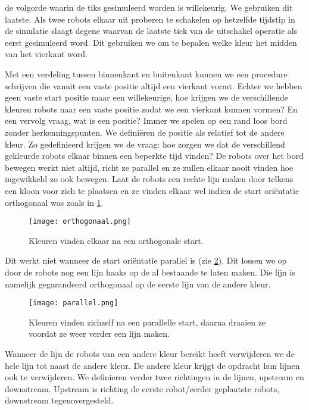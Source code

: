 \documentclass[10pt]{article}
\begin{document}
 de volgorde waarin de tiks gesimuleerd worden is willekeurig. We gebruiken dit laatste. Als twee robots elkaar uit proberen te schakelen op hetzelfde tijdstip in de simulatie slaagt degene waarvan de laatste tick van de uitschakel operatie als eerst gesimuleerd word. Dit gebruiken we om te bepalen welke kleur het midden van het vierkant word.

\label{lijnen}
Met een verdeling tussen binnenkant en buitenkant kunnen we een procedure schrijven die vanuit een vaste positie altijd een vierkant vormt. Echter we hebben geen vaste start positie maar een willekeurige, hoe krijgen we de verschillende kleuren robots naar een vaste positie zodat we een vierkant kunnen vormen? En een vervolg vraag, wat is een positie? Immer we spelen op een rand loos bord zonder herkenningspunten. We definiëren de positie als relatief tot de andere kleur. Zo gedefinieerd krijgen we de vraag: hoe zorgen we dat de verschillend gekleurde robots elkaar binnen een beperkte tijd vinden? De robots over het bord bewegen werkt niet altijd, richt ze parallel en ze zullen elkaar nooit vinden hoe ingewikkeld zo ook bewegen. Laat de robots een rechte lijn maken door telkens een kloon voor zich te plaatsen en ze vinden elkaar wel indien de start oriëntatie orthogonaal was zoals in \ref{fig:0a}. 

\begin{figure}[h!]
  \centering
  \texttt{[image: orthogonaal.png]}
  \caption{Kleuren vinden elkaar na een orthogonale start.}
  \label{fig:0a}
\end{figure}

Dit werkt niet wanneer de start oriëntatie parallel is (zie \ref{fig:0b}). Dit lossen we op door de robots nog een lijn haaks op de al bestaande te laten maken. Die lijn is namelijk gegarandeerd orthogonaal op de eerste lijn van de andere kleur. 

\begin{figure}[h!]
  \centering
  \texttt{[image: parallel.png]}
  \caption{Kleuren vinden zichzelf na een parallelle start, daarna draaien ze voordat ze weer verder een lijn maken.}
  \label{fig:0b}
\end{figure}

Wanneer de lijn de robots van een andere kleur bereikt heeft verwijderen we de hele lijn tot naast de andere kleur. De andere kleur krijgt de opdracht hun lijnen ook te verwijderen. We definieren verder twee richtingen in de lijnen, upstream en downstream. Upstream is richting de eerste robot/eerder geplaatste robots, downstream tegenovergesteld.
\end{document}
